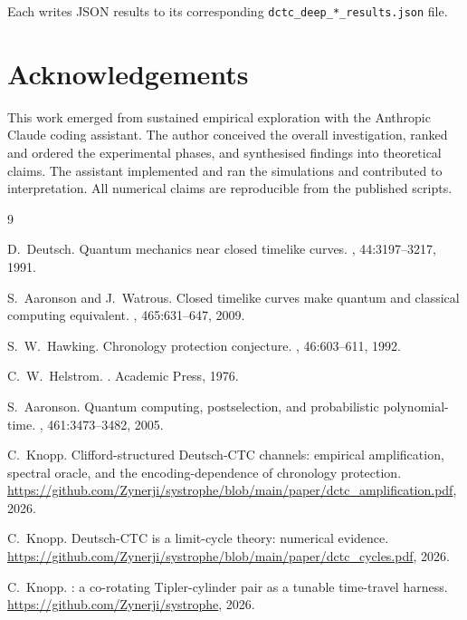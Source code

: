 \documentclass[11pt,a4paper]{article}
\begin{document}
Each writes JSON results to its corresponding
\texttt{dctc\_deep\_*\_results.json} file.

\section*{Acknowledgements}

This work emerged from sustained empirical exploration with the
Anthropic Claude coding assistant. The author conceived the
overall investigation, ranked and ordered the experimental phases,
and synthesised findings into theoretical claims. The assistant
implemented and ran the simulations and contributed to
interpretation. All numerical claims are reproducible from the
published scripts.


\begin{thebibliography}{9}

D.~Deutsch.
\newblock Quantum mechanics near closed timelike curves.
, 44:3197--3217, 1991.

S.~Aaronson and J.~Watrous.
\newblock Closed timelike curves make quantum and classical computing
equivalent.
, 465:631--647, 2009.

S.~W.~Hawking.
\newblock Chronology protection conjecture.
, 46:603--611, 1992.

C.~W.~Helstrom.
.
\newblock Academic Press, 1976.

S.~Aaronson.
\newblock Quantum computing, postselection, and probabilistic
polynomial-time.
, 461:3473--3482, 2005.

C.~Knopp.
\newblock Clifford-structured Deutsch-CTC channels: empirical
amplification, spectral oracle, and the encoding-dependence of
chronology protection.
\newblock \url{https://github.com/Zynerji/systrophe/blob/main/paper/dctc_amplification.pdf}, 2026.

C.~Knopp.
\newblock Deutsch-CTC is a limit-cycle theory: numerical evidence.
\newblock \url{https://github.com/Zynerji/systrophe/blob/main/paper/dctc_cycles.pdf}, 2026.

C.~Knopp.
: a co-rotating Tipler-cylinder pair as a tunable
time-travel harness.
\newblock \url{https://github.com/Zynerji/systrophe}, 2026.

\end{thebibliography}
\end{document}

